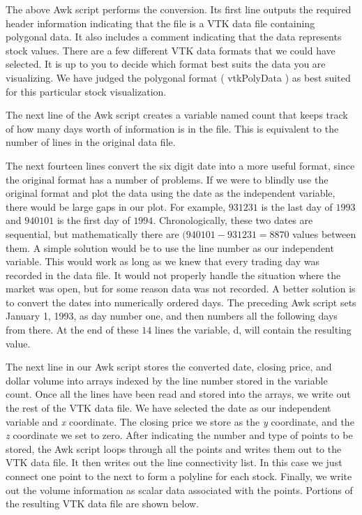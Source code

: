 The above Awk script performs the conversion. Its first line outputs the required header information indicating that the file is a VTK data file containing polygonal data. It also includes a comment indicating that the data represents stock values. There are a few different VTK data formats that we could have selected. It is up to you to decide which format best suits the data you are visualizing. We have judged the polygonal format ( vtkPolyData ) as best suited for this particular stock visualization.

The next line of the Awk script creates a variable named count that keeps track of how many days worth of information is in the file. This is equivalent to the number of lines in the original data file.

The next fourteen lines convert the six digit date into a more useful format, since the original format has a number of problems. If we were to blindly use the original format and plot the data using the date as the independent variable, there would be large gaps in our plot. For example,  $931231$ is the last day of $1993$ and $940101$ is the first day of $1994$. Chronologically, these two dates are sequential, but mathematically there are $(940101 - 931231 = 8870$ values between them. A simple solution would be to use the line number as our independent variable. This would work as long as we knew that every trading day was recorded in the data file. It would not properly handle the situation where the market was open, but for some reason data was not recorded. A better solution is to convert the dates into numerically ordered days. The preceding Awk script sets January 1, 1993, as day number one, and then numbers all the following days from there. At the end of these $14$ lines the variable, d, will contain the resulting value.

The next line in our Awk script stores the converted date, closing price, and dollar volume  into arrays indexed by the line number stored in the variable count. Once all the lines have been read and stored into the arrays, we write out the rest of the VTK data file. We have selected the date as our independent variable and \emph{x} coordinate. The closing price we store as the \emph{y} coordinate, and the \emph{z} coordinate we set to zero. After indicating the number and type of points to be stored, the Awk script loops through all the points and writes them out to the VTK data file. It then writes out the line connectivity list. In this case we just connect one point to the next to form a polyline for each stock. Finally, we write out the volume information as scalar data associated with the points. Portions of the resulting VTK data file are shown below.

